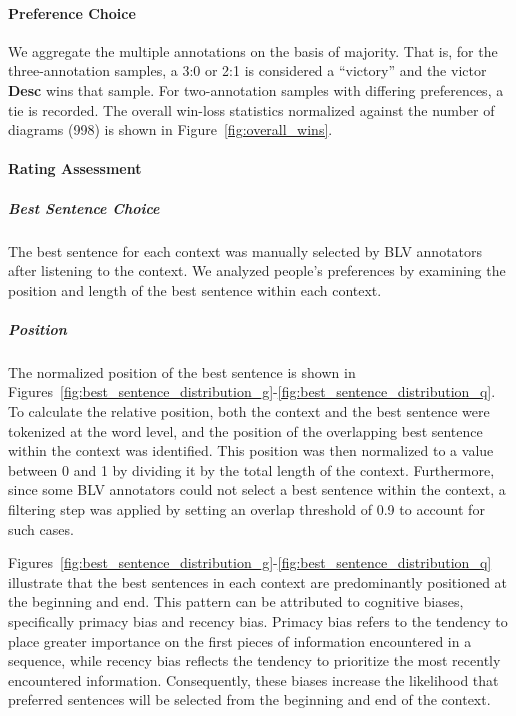 \paragraph{Preference Choice}
We aggregate the multiple annotations on the basis of majority. That is, for the three-annotation samples, a 3:0 or 2:1 is considered a ``victory'' and the victor \textbf{Desc} wins that sample. For two-annotation samples with differing preferences, a tie is recorded. The overall win-loss statistics normalized against the number of diagrams (998) is shown in Figure~\ref{fig:overall_wins}.


\paragraph{Rating Assessment}



\subparagraph{Best Sentence Choice}

The best sentence for each context was manually selected by BLV annotators after listening to the context. We analyzed people’s preferences by examining the position and length of the best sentence within each context.

\subparagraph{Position}

The normalized position of the best sentence is shown in Figures~\ref{fig:best_sentence_distribution_g}-\ref{fig:best_sentence_distribution_q}. To calculate the relative position, both the context and the best sentence were tokenized at the word level, and the position of the overlapping best sentence within the context was identified. This position was then normalized to a value between 0 and 1 by dividing it by the total length of the context. Furthermore, since some BLV annotators could not select a best sentence within the context, a filtering step was applied by setting an overlap threshold of 0.9 to account for such cases.

Figures~\ref{fig:best_sentence_distribution_g}-\ref{fig:best_sentence_distribution_q} illustrate that the best sentences in each context are predominantly positioned at the beginning and end. This pattern can be attributed to cognitive biases, specifically primacy bias and recency bias. Primacy bias refers to the tendency to place greater importance on the first pieces of information encountered in a sequence, while recency bias reflects the tendency to prioritize the most recently encountered information. Consequently, these biases increase the likelihood that preferred sentences will be selected from the beginning and end of the context.



